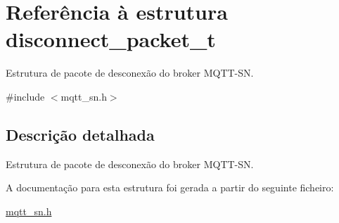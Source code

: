 \hypertarget{structdisconnect__packet__t}{\section{Referência à estrutura disconnect\+\_\+packet\+\_\+t}
\label{structdisconnect__packet__t}
}


Estrutura de pacote de desconexão do broker M\+Q\+T\+T-\/\+S\+N.  




{\ttfamily \#include $<$mqtt\+\_\+sn.\+h$>$}



\subsection{Descrição detalhada}
Estrutura de pacote de desconexão do broker M\+Q\+T\+T-\/\+S\+N. 

A documentação para esta estrutura foi gerada a partir do seguinte ficheiro\+:\begin{DoxyCompactItemize}
\item 
\hyperlink{mqtt__sn_8h}{mqtt\+\_\+sn.\+h}\end{DoxyCompactItemize}
